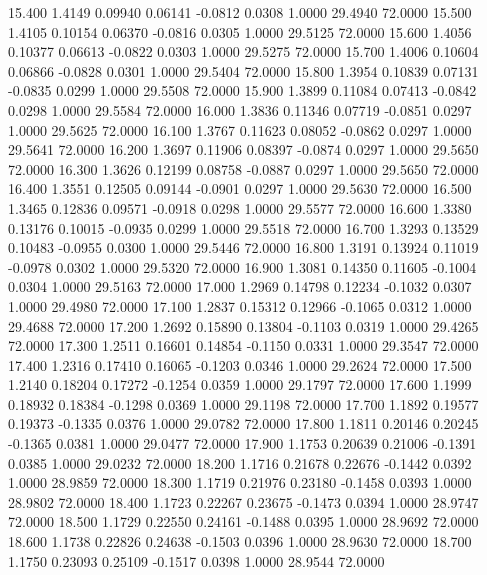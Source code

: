   15.400   1.4149   0.09940   0.06141  -0.0812   0.0308   1.0000  29.4940  72.0000
  15.500   1.4105   0.10154   0.06370  -0.0816   0.0305   1.0000  29.5125  72.0000
  15.600   1.4056   0.10377   0.06613  -0.0822   0.0303   1.0000  29.5275  72.0000
  15.700   1.4006   0.10604   0.06866  -0.0828   0.0301   1.0000  29.5404  72.0000
  15.800   1.3954   0.10839   0.07131  -0.0835   0.0299   1.0000  29.5508  72.0000
  15.900   1.3899   0.11084   0.07413  -0.0842   0.0298   1.0000  29.5584  72.0000
  16.000   1.3836   0.11346   0.07719  -0.0851   0.0297   1.0000  29.5625  72.0000
  16.100   1.3767   0.11623   0.08052  -0.0862   0.0297   1.0000  29.5641  72.0000
  16.200   1.3697   0.11906   0.08397  -0.0874   0.0297   1.0000  29.5650  72.0000
  16.300   1.3626   0.12199   0.08758  -0.0887   0.0297   1.0000  29.5650  72.0000
  16.400   1.3551   0.12505   0.09144  -0.0901   0.0297   1.0000  29.5630  72.0000
  16.500   1.3465   0.12836   0.09571  -0.0918   0.0298   1.0000  29.5577  72.0000
  16.600   1.3380   0.13176   0.10015  -0.0935   0.0299   1.0000  29.5518  72.0000
  16.700   1.3293   0.13529   0.10483  -0.0955   0.0300   1.0000  29.5446  72.0000
  16.800   1.3191   0.13924   0.11019  -0.0978   0.0302   1.0000  29.5320  72.0000
  16.900   1.3081   0.14350   0.11605  -0.1004   0.0304   1.0000  29.5163  72.0000
  17.000   1.2969   0.14798   0.12234  -0.1032   0.0307   1.0000  29.4980  72.0000
  17.100   1.2837   0.15312   0.12966  -0.1065   0.0312   1.0000  29.4688  72.0000
  17.200   1.2692   0.15890   0.13804  -0.1103   0.0319   1.0000  29.4265  72.0000
  17.300   1.2511   0.16601   0.14854  -0.1150   0.0331   1.0000  29.3547  72.0000
  17.400   1.2316   0.17410   0.16065  -0.1203   0.0346   1.0000  29.2624  72.0000
  17.500   1.2140   0.18204   0.17272  -0.1254   0.0359   1.0000  29.1797  72.0000
  17.600   1.1999   0.18932   0.18384  -0.1298   0.0369   1.0000  29.1198  72.0000
  17.700   1.1892   0.19577   0.19373  -0.1335   0.0376   1.0000  29.0782  72.0000
  17.800   1.1811   0.20146   0.20245  -0.1365   0.0381   1.0000  29.0477  72.0000
  17.900   1.1753   0.20639   0.21006  -0.1391   0.0385   1.0000  29.0232  72.0000
  18.200   1.1716   0.21678   0.22676  -0.1442   0.0392   1.0000  28.9859  72.0000
  18.300   1.1719   0.21976   0.23180  -0.1458   0.0393   1.0000  28.9802  72.0000
  18.400   1.1723   0.22267   0.23675  -0.1473   0.0394   1.0000  28.9747  72.0000
  18.500   1.1729   0.22550   0.24161  -0.1488   0.0395   1.0000  28.9692  72.0000
  18.600   1.1738   0.22826   0.24638  -0.1503   0.0396   1.0000  28.9630  72.0000
  18.700   1.1750   0.23093   0.25109  -0.1517   0.0398   1.0000  28.9544  72.0000
